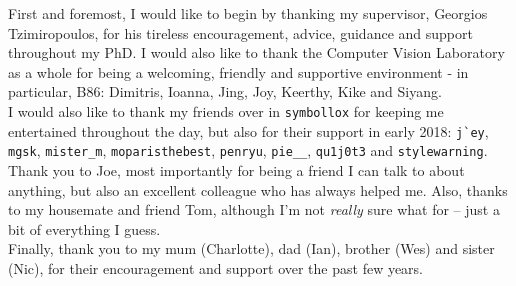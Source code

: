 
\begin{acknowledgements}

  First and foremost, I would like to begin by thanking my supervisor,
  Georgios Tzimiropoulos, for his tireless encouragement, advice,
  guidance and support throughout my PhD. I would also like to thank
  the Computer Vision Laboratory as a whole for being a welcoming,
  friendly and supportive environment - in particular, B86: Dimitris,
  Ioanna, Jing, Joy, Keerthy, Kike and Siyang.
  \\ [0.3em]

  \noindent I would also like to thank my friends over in
  \verb|symbollox| for keeping me entertained throughout the day, but
  also for their support in early 2018: \verb|j`ey|, \verb|mgsk|,
  \verb|mister_m|, \verb|moparisthebest|, \verb|penryu|, \verb|pie__|,
  \verb|qu1j0t3| and \verb|stylewarning|.
  \\ [0.3em]

  \noindent Thank you to Joe, most importantly for being a friend I
  can talk to about anything, but also an excellent colleague who has
  always helped me. Also, thanks to my housemate and friend Tom,
  although I'm not \textit{really} sure what for -- just a bit of
  everything I guess.
  \\ [0.3em]

  \noindent Finally, thank you to my mum (Charlotte), dad (Ian),
  brother (Wes) and sister (Nic), for their encouragement and support
  over the past few years.



\end{acknowledgements}
